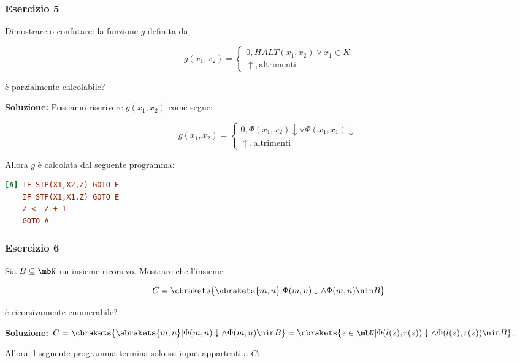 \subsubsection{Esercizio 5}

Dimostrare o confutare: la funzione \(g\) definita da

\begin{equation}
  g(x_1,x_2) = \begin{cases}
    0, \textit{HALT}(x_1,x_2) \lor x_1 \in K\\
    \uparrow, \text{altrimenti}
  \end{cases}
\end{equation}

è parzialmente calcolabile?

\textbf{Soluzione: } Possiamo riscrivere \(g(x_1,x_2)\) come segue:

\begin{equation}
  g(x_1,x_2) = \begin{cases}
    0, \Phi(x_1,x_2) \downarrow \lor \Phi(x_1,x_1) \downarrow\\
    \uparrow, \text{altrimenti}
  \end{cases}
\end{equation}

Allora \(g\) è calcolata dal seguente programma:

\begin{lstlisting}[language=ini, caption={ }]
[A] IF STP(X1,X2,Z) GOTO E
    IF STP(X1,X1,Z) GOTO E
    Z <- Z + 1
    GOTO A
\end{lstlisting}

\subsubsection{Esercizio 6}

Sia \(B \subseteq \mbN\) un insieme ricorsivo. Mostrare che l'insieme

\begin{equation}
  C = \cbrakets{\abrakets{m,n} \vert \Phi(m,n) \downarrow \land \Phi(m,n) \nin B}
\end{equation}

è ricorsivamente enumerabile?

\textbf{Soluzione: } \(C=\cbrakets{\abrakets{m,n} \vert \Phi(m,n) \downarrow \land \Phi(m,n) \nin B}=\cbrakets{ z \in \mbN \vert \Phi(l(z),r(z)) \downarrow \land \Phi(l(z),r(z)) \nin B}\).

Allora il seguente programma termina solo su input appartenti a \(C\):


